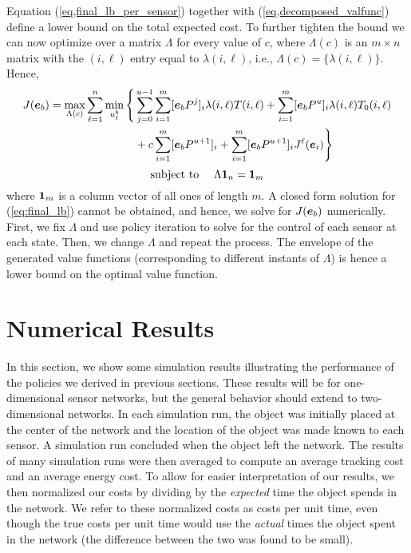 \documentclass[journal,draftcls,onecolumn,11pt]{IEEEtran}
\newcommand{\emb}[1]{\text{\boldmath{$#1$}}}
\begin{document}
Equation (\ref{eq,final_lb_per_sensor}) together with (\ref{eq,decomposed_valfunc}) define a lower bound on the total expected cost. To further tighten the bound we can now optimize over a matrix $\Lambda$ for every value of $c$, where $\Lambda(c)$ is an $m\times n$ matrix with the $(i,\ell)$ entry equal to $\lambda(i,\ell)$, i.e., $\Lambda(c)=\{\lambda(i,\ell)\}$. Hence,
\begin{align}
J(\emb{e}_b) = \max_{\Lambda(c)}\sum_{\ell = 1}^n\min_{u^b_{\ell}} \Bigg\{&\sum_{j=0}^{u-1}\sum_{i=1}^m [\emb{e}_bP^j]_i \lambda(i,\ell)T(i,\ell)+\sum_{i=1}^m [\emb{e}_b P^u]_i \lambda(i,\ell)T_0(i,\ell)\nonumber\\
&+ c\sum_{i=1}^m [\emb{e}_bP^{u+1}]_i+\sum_{i=1}^m [\emb{e}_bP^{u+1}]_i J^{\ell}(\emb{e}_i)\Bigg\}
\label{eq:final_lb}
\end{align}
\[
\mbox{subject to}~~~~ \Lambda \emb{1}_n = \emb{1}_m
\]
where $\emb{1}_m$ is a column vector of all ones of length $m$. A closed form solution for (\ref{eq:final_lb}) cannot be obtained, and hence, we solve for $J(\emb{e}_b)$ numerically. First, we fix $\Lambda$ and use policy iteration \cite{bertsekas07} to solve for the control of each sensor at each state. Then, we change $\Lambda$ and repeat the process. The envelope of the generated value functions (corresponding to different instants of $\Lambda$) is hence a lower bound on the optimal value function.

\section{Numerical Results} \label{sec:num_res}
In this section, we show some simulation results illustrating the performance of the policies we derived in previous sections.  These results will be for one-dimensional sensor networks, but the general behavior should extend to two-dimensional networks.  In each simulation run, the object was initially placed at the center of the network and the location of the object was made known to each sensor.  A simulation run concluded when the object left the network.  The results of many simulation runs were then averaged to compute an average tracking cost and an average energy cost.  To allow for easier interpretation of our results, we then normalized our costs by dividing by the {\em expected} time the object spends in the network.  We refer to these normalized costs as costs per unit time, even though the true costs per unit time would use the {\em actual} times the object spent in the network (the difference between the two was found to be small).
\end{document}
